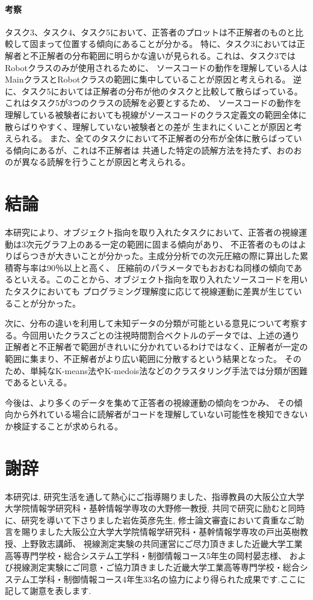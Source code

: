 \documentclass[paper=a4paper,fontsize=11pt]{jlreq}
\begin{document}
    \subsection{考察}
      タスク3、タスク4、タスク5において、正答者のプロットは不正解者のものと比較して固まって位置する傾向にあることが分かる。
      特に、タスク3においては正解者と不正解者の分布範囲に明らかな違いが見られる。これは、タスク3ではRobotクラスのみが使用されるために、
      ソースコードの動作を理解している人はMainクラスとRobotクラスの範囲に集中していることが原因と考えられる。
      逆に、タスク5においては正解者の分布が他のタスクと比較して散らばっている。これはタスク5が3つのクラスの読解を必要とするため、
      ソースコードの動作を理解している被験者においても視線がソースコードのクラス定義文の範囲全体に散らばりやすく、理解していない被験者との差が
      生まれにくいことが原因と考えられる。
      また、全てのタスクにおいて不正解者の分布が全体に散らばっている傾向にあるが、これは不正解者は
      共通した特定の読解方法を持たず、おのおのが異なる読解を行うことが原因と考えられる。

    \pagebreak

\part{結論}
  本研究により、オブジェクト指向を取り入れたタスクにおいて、正答者の視線運動は3次元グラフ上のある一定の範囲に固まる傾向があり、
  不正答者のものはよりばらつきが大きいことが分かった。主成分分析での次元圧縮の際に算出した累積寄与率は90％以上と高く、
  圧縮前のパラメータでもおおむね同様の傾向であるといえる。このことから、オブジェクト指向を取り入れたソースコードを用いたタスクにおいても
  プログラミング理解度に応じて視線運動に差異が生じていることが分かった。

  次に、分布の違いを利用して未知データの分類が可能といる意見について考察する。今回用いたクラスごとの注視時間割合ベクトルのデータでは、上述の通り
  正解者と不正解者で範囲がきれいに分かれているわけではなく、正解者が一定の範囲に集まり、不正解者がより広い範囲に分散するという結果となった。
  そのため、単純なK-means法やK-medois法などのクラスタリング手法では分類が困難であるといえる。

  今後は、より多くのデータを集めて正答者の視線運動の傾向をつかみ、
  その傾向から外れている場合に読解者がコードを理解していない可能性を検知できないか検証することが求められる。

\pagebreak

\part*{謝辞}
  本研究は,
  研究生活を通して熱心にご指導賜りました、指導教員の大阪公立大学大学院情報学研究科・基幹情報学専攻の大野修一教授,
  共同で研究に励むと同時に、研究を導いて下さりました岩佐英彦先生,
  修士論文審査において貴重なご助言を賜りました大阪公立大学大学院情報学研究科・基幹情報学専攻の戸出英樹教授、上野敦志講師、
  視線測定実験の共同運営にご尽力頂きました近畿大学工業高等専門学校・総合システム工学科・制御情報コース5年生の岡村晏志様、
  および視線測定実験にご同意・ご協力頂きました近畿大学工業高等専門学校・総合システム工学科・制御情報コース4年生33名の協力により得られた成果です.ここに記して謝意を表します.
\end{document}
